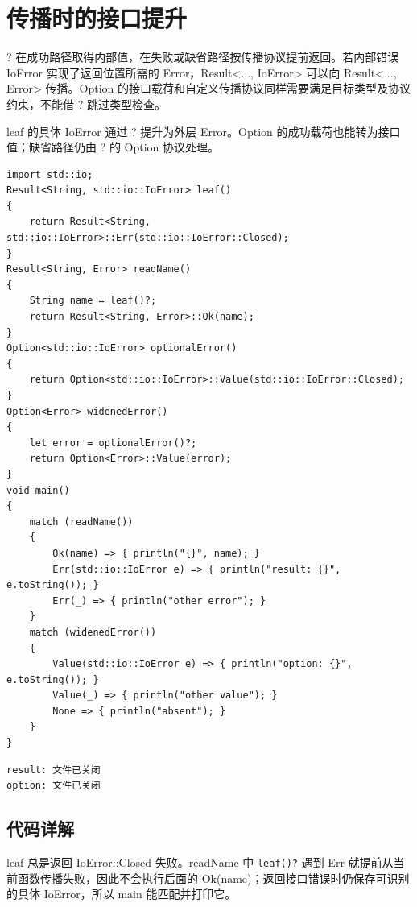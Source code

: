 \section{传播时的接口提升}

? 在成功路径取得内部值，在失败或缺省路径按传播协议提前返回。若内部错误 IoError 实现了返回位置所需的 Error，Result<..., IoError> 可以向 Result<..., Error> 传播。Option 的接口载荷和自定义传播协议同样需要满足目标类型及协议约束，不能借 ? 跳过类型检查。

leaf 的具体 IoError 通过 ? 提升为外层 Error。Option 的成功载荷也能转为接口值；缺省路径仍由 ? 的 Option 协议处理。

\par
\medskip
\begin{lstlisting}[style=chali]
import std::io;
Result<String, std::io::IoError> leaf()
{
    return Result<String, std::io::IoError>::Err(std::io::IoError::Closed);
}
Result<String, Error> readName()
{
    String name = leaf()?;
    return Result<String, Error>::Ok(name);
}
Option<std::io::IoError> optionalError()
{
    return Option<std::io::IoError>::Value(std::io::IoError::Closed);
}
Option<Error> widenedError()
{
    let error = optionalError()?;
    return Option<Error>::Value(error);
}
void main()
{
    match (readName())
    {
        Ok(name) => { println("{}", name); }
        Err(std::io::IoError e) => { println("result: {}", e.toString()); }
        Err(_) => { println("other error"); }
    }
    match (widenedError())
    {
        Value(std::io::IoError e) => { println("option: {}", e.toString()); }
        Value(_) => { println("other value"); }
        None => { println("absent"); }
    }
}
\end{lstlisting}
\par
\medskip

\par
\medskip
\begin{lstlisting}[style=out]
result: 文件已关闭
option: 文件已关闭
\end{lstlisting}
\par
\medskip

\subsection*{代码详解}

leaf 总是返回 IoError::Closed 失败。readName 中 \texttt{leaf(\allowbreak{})\allowbreak{}?} 遇到 Err 就提前从当前函数传播失败，因此不会执行后面的 Ok(name)；返回接口错误时仍保存可识别的具体 IoError，所以 main 能匹配并打印它。


